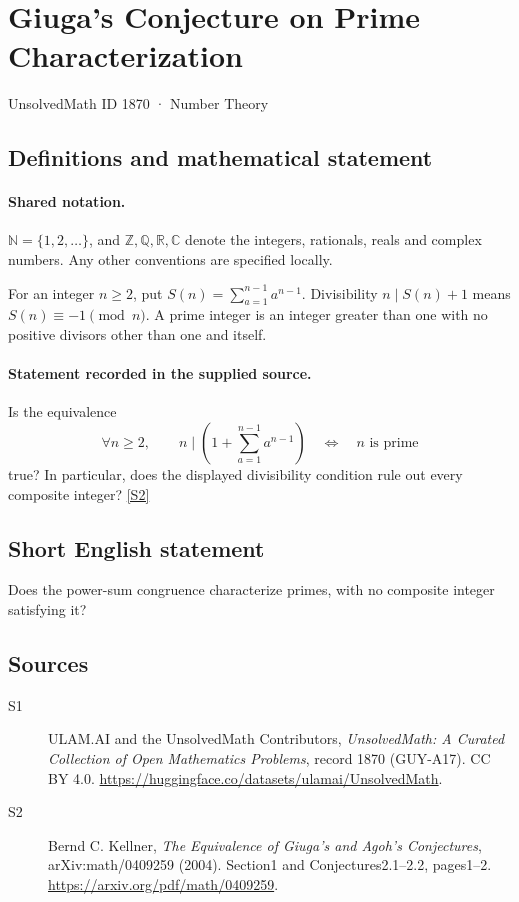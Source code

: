 \documentclass[11pt]{book}
\newcommand{\sref}[2]{\hyperlink{source:#1:#2}{[S#2]}}
\begin{document}
\setcounter{section}{1869}
\section{Giuga's Conjecture on Prime Characterization}\label{1870}
{\small\sffamily UnsolvedMath ID 1870 · Number Theory}
\subsection{Definitions and mathematical statement}

\paragraph{Shared notation.}$\mathbb N=\{1,2,\ldots\}$, and $\mathbb Z,\mathbb Q,\mathbb R,\mathbb C$ denote the integers, rationals, reals and complex numbers. Any other conventions are specified locally.


For an integer $n\geq2$, put $S(n)=\sum_{a=1}^{n-1}a^{n-1}$. Divisibility $n\mid S(n)+1$ means $S(n)\equiv-1\pmod n$. A prime integer is an integer greater than one with no positive divisors other than one and itself.
\paragraph{Statement recorded in the supplied source.}
Is the equivalence
\[\forall n\geq2,\qquad n\mid\left(1+\sum_{a=1}^{n-1}a^{n-1}\right)\quad\Longleftrightarrow\quad n\text{ is prime}\]
true? In particular, does the displayed divisibility condition rule out every composite integer? \sref{1870}{2}
\subsection{Short English statement}
Does the power-sum congruence characterize primes, with no composite integer satisfying it?
\subsection{Sources}
\begin{description}
\item[\hypertarget{source:1870:1}{S1}] ULAM.AI and the UnsolvedMath Contributors, \emph{UnsolvedMath: A Curated Collection of Open Mathematics Problems}, record 1870 (GUY-A17). CC BY 4.0. \url{https://huggingface.co/datasets/ulamai/UnsolvedMath}.
\item[\hypertarget{source:1870:2}{S2}] Bernd C. Kellner, \emph{The Equivalence of Giuga’s and Agoh’s Conjectures}, arXiv:math/0409259 (2004). Section1 and Conjectures2.1--2.2, pages1--2. \url{https://arxiv.org/pdf/math/0409259}.
\end{description}
\label{end:1870}
\end{document}
